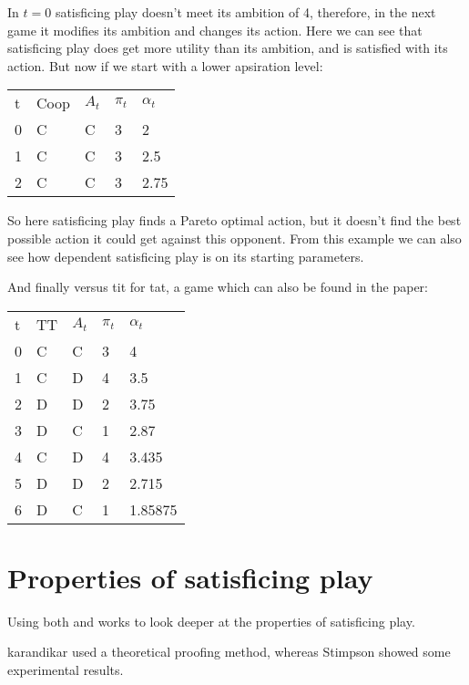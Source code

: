 \drafting In $t=0$ satisficing play doesn't meet its ambition of 4, therefore, in the
next game it modifies its ambition and changes its action. Here we can see
that satisficing play does get more utility than its ambition, and is satisfied
with its action.
But now if we start with a lower apsiration level:

\begin{tabular}{lllll}
  t & Coop & $A_t$ & $\pi_t$ & $\alpha_t$ \\
  0 & C     & C    & 3       & 2 \\
  1 & C     & C    & 3       & 2.5 \\
  2 & C     & C    & 3       & 2.75 \\
\end{tabular}

\drafting So here satisficing play finds a Pareto optimal action, but it doesn't find
the best possible action it could get against this opponent. From this example
we can also see how dependent satisficing play is on its starting parameters.

\drafting And finally versus tit for tat, a game which can also be found in the
\citep{stimpson:2001} paper:

\begin{tabular}{lllll}
        t & TT & $A_t$ & $\pi_t$ & $\alpha_t$ \\
        0 & C     & C    & 3       & 4  \\
        1 & C     & D    & 4       & 3.5 \\
        2 & D     & D    & 2       & 3.75 \\
        3 & D     & C    & 1       & 2.87 \\
        4 & C     & D    & 4       & 3.435 \\
        5 & D     & D    & 2       & 2.715 \\
        6 & D     & C    & 1       & 1.85875 \\
\end{tabular}
\section{Properties of satisficing play}
\drafting

Using both \citep{karandikar} and \citep{stimpson:2001} works to look deeper
at the properties of satisficing play. 

karandikar used a theoretical proofing method, whereas Stimpson showed some
experimental results.

